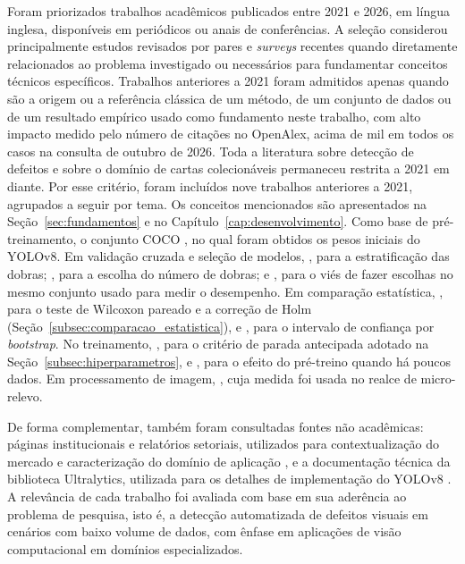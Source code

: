\documentclass[
    12pt,                %
    openright,           %
    oneside,             %
    a4paper,             %
    english,             %
    brazil               %
]{abntex2}
\begin{document}
Foram priorizados trabalhos acadêmicos publicados entre 2021 e 2026,
em língua inglesa, disponíveis em periódicos ou anais de conferências.
A seleção considerou principalmente estudos revisados por pares e
\textit{surveys} recentes quando diretamente relacionados ao problema
investigado ou necessários para fundamentar conceitos técnicos
específicos. Trabalhos anteriores a 2021 foram admitidos apenas quando
são a origem ou a referência clássica de um método, de um conjunto de
dados ou de um resultado empírico usado como fundamento neste trabalho, com alto impacto medido pelo número de citações no
OpenAlex, acima de mil em todos os casos na consulta de outubro de
2026. Toda a literatura sobre detecção de defeitos e sobre o
domínio de cartas colecionáveis permaneceu restrita a 2021 em diante.
Por esse critério, foram incluídos nove trabalhos anteriores a 2021,
agrupados a seguir por tema. Os conceitos mencionados são apresentados
na Seção~\ref{sec:fundamentos} e no Capítulo~\ref{cap:desenvolvimento}.
Como base de pré-treinamento, o conjunto
COCO \cite{Lin2014}, no qual foram obtidos os pesos iniciais do YOLOv8.
Em validação cruzada e seleção de modelos, ,
para a estratificação das dobras; , para a
escolha do número de dobras; e , para o viés de
fazer escolhas no mesmo conjunto usado para medir o desempenho. Em
comparação estatística, , para o teste de
Wilcoxon pareado e a correção de Holm
(Seção~\ref{subsec:comparacao_estatistica}), e
, para o intervalo de confiança por
\textit{bootstrap}. No treinamento, , para o
critério de parada antecipada adotado na
Seção~\ref{subsec:hiperparametros}, e , para o
efeito do pré-treino quando há poucos dados. Em processamento de
imagem, , cuja medida foi usada no realce de
micro-relevo.

De forma complementar, também foram consultadas fontes não acadêmicas:
páginas institucionais e relatórios setoriais, utilizados para
contextualização do mercado e caracterização do domínio de aplicação
\cite{BRI2026,Beckett_Standards}, e a documentação técnica da biblioteca Ultralytics,
utilizada para os detalhes de implementação do YOLOv8 \cite{Jocher2023}.
A relevância de cada trabalho foi 
avaliada com base em sua aderência ao problema de pesquisa, isto é, a 
detecção automatizada de defeitos visuais em cenários com baixo volume 
de dados, com ênfase em aplicações de visão computacional em domínios 
especializados.
\end{document}
